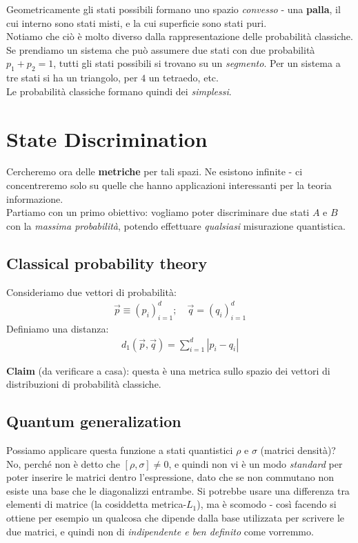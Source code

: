 \documentclass[../../InformazioneQuantistica.tex]{subfiles}
\begin{document}
Geometricamente gli stati possibili formano uno spazio \textit{convesso} - una \textbf{palla}, il cui interno sono stati misti, e la cui superficie sono stati puri.\\
Notiamo che ciò è molto diverso dalla rappresentazione delle probabilità classiche. Se prendiamo un sistema che può assumere due stati con due probabilità $p_1+p_2=1$, tutti gli stati possibili si trovano su un \textit{segmento}. Per un sistema a tre stati si ha un triangolo, per $4$ un tetraedo, etc.\\
Le probabilità classiche formano quindi dei \textit{simplessi}.\\

\section{State Discrimination}
Cercheremo ora delle \textbf{metriche} per tali spazi. Ne esistono infinite - ci concentreremo solo su quelle che hanno applicazioni interessanti per la teoria informazione.\\

Partiamo con un primo obiettivo: vogliamo poter discriminare due stati $A$ e $B$ con la \textit{massima probabilità}, potendo effettuare \textit{qualsiasi} misurazione quantistica.

\subsection{Classical probability theory}
Consideriamo due vettori di probabilità:
\begin{align*}
\vec{p} \equiv (p_i)_{i=1}^d; \quad \vec{q}=(q_i)_{i=1}^d
\end{align*}
Definiamo una distanza:
\begin{align*}
d_1(\vec{p},\vec{q}) = \sum_{i=1}^d |p_i - q_i|
\end{align*}

\textbf{Claim} (da verificare a casa): questa è una metrica sullo spazio dei vettori di distribuzioni di probabilità classiche.

\subsection{Quantum generalization}
Possiamo applicare questa funzione a stati quantistici $\rho$ e $\sigma$ (matrici densità)?\\
No, perché non è detto che $[\rho,\sigma]\neq 0$, e quindi non vi è un modo \textit{standard} per poter inserire le matrici dentro l'espressione, dato che se non commutano non esiste una base che le diagonalizzi entrambe. Si potrebbe usare una differenza tra elementi di matrice (la cosiddetta metrica-$L_1$), ma è scomodo - così facendo si ottiene per esempio un qualcosa che dipende dalla base utilizzata per scrivere le due matrici, e quindi non di \textit{indipendente e ben definito} come vorremmo.\\
\end{document}
